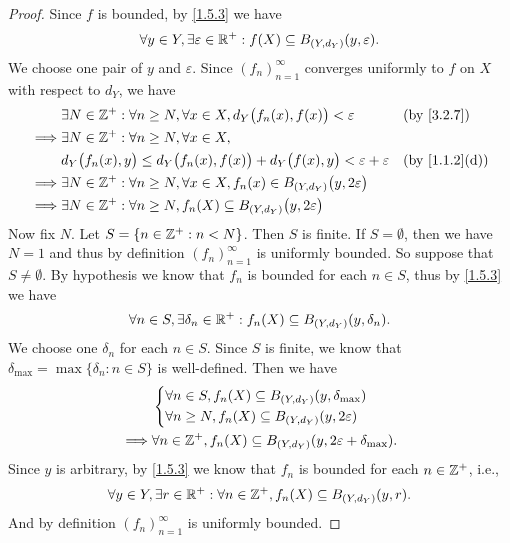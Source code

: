 \begin{proof}
  Since \(f\) is bounded, by \cref{1.5.3} we have
  \[
    \forall y \in Y, \exists \varepsilon \in \mathbb{R}^+ : f(X) \subseteq B_{(Y, d_Y)}(y, \varepsilon).
  \]
  We choose one pair of \(y\) and \(\varepsilon\).
  Since \((f_n)_{n = 1}^\infty\) converges uniformly to \(f\) on \(X\) with respect to \(d_Y\), we have
  \begin{align*}
             & \exists N \in \Z^+ : \forall n \geq N, \forall x \in X, d_Y\big(f_n(x), f(x)\big) < \varepsilon          &  & \by{3.2.7}                  \\
    \implies & \exists N \in \Z^+ : \forall n \geq N, \forall x \in X,                                                                                   \\
             & d_Y\big(f_n(x), y\big) \leq d_Y\big(f_n(x), f(x)\big) + d_Y\big(f(x), y\big) < \varepsilon + \varepsilon &  & \text{(by \cref{1.1.2}(d))} \\
    \implies & \exists N \in \Z^+ : \forall n \geq N, \forall x \in X, f_n(x) \in B_{(Y, d_Y)}\big(y, 2\varepsilon\big)                                  \\
    \implies & \exists N \in \Z^+ : \forall n \geq N, f_n(X) \subseteq B_{(Y, d_Y)}\big(y, 2\varepsilon\big)
  \end{align*}
  Now fix \(N\).
  Let \(S = \{n \in \mathbb{Z}^+ : n < N\}\).
  Then \(S\) is finite.
  If \(S = \emptyset\), then we have \(N = 1\) and thus by definition \((f_n)_{n = 1}^\infty\) is uniformly bounded.
  So suppose that \(S \neq \emptyset\).
  By hypothesis we know that \(f_n\) is bounded for each \(n \in S\), thus by \cref{1.5.3} we have
  \[
    \forall n \in S, \exists \delta_n \in \mathbb{R}^+ : f_n(X) \subseteq B_{(Y, d_Y)}(y, \delta_n).
  \]
  We choose one \(\delta_n\) for each \(n \in S\).
  Since \(S\) is finite, we know that \(\delta_{\max} = \max\{\delta_n : n \in S\}\) is well-defined.
  Then we have
  \begin{align*}
             & \begin{dcases}
                 \forall n \in S, f_n(X) \subseteq B_{(Y, d_Y)}(y, \delta_{\max}) \\
                 \forall n \geq N, f_n(X) \subseteq B_{(Y, d_Y)}(y, 2\varepsilon)
               \end{dcases}                    \\
    \implies & \forall n \in \mathbb{Z}^+, f_n(X) \subseteq B_{(Y, d_Y)}(y, 2\varepsilon + \delta_{\max}).
  \end{align*}
  Since \(y\) is arbitrary, by \cref{1.5.3} we know that \(f_n\) is bounded for each \(n \in \mathbb{Z}^+\), i.e.,
  \[
    \forall y \in Y, \exists r \in \mathbb{R}^+ : \forall n \in \mathbb{Z}^+, f_n(X) \subseteq B_{(Y, d_Y)}(y, r).
  \]
  And by definition \((f_n)_{n = 1}^\infty\) is uniformly bounded.
\end{proof}